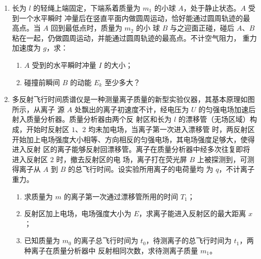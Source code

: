 \begin{enumerate}
\item
长为 $ l $ 的轻绳上端固定，下端系着质量为 $ m_{1} $ 的小球 $ A $，处于静止状态。$ A $ 受到一个水平瞬时
冲量后在竖直平面内做圆周运动，恰好能通过圆周轨迹的最高点。当 $ A $ 回到最低点时，质量为 $ m_{2} $ 的小
球 $ B $ 与之迎面正碰，碰后 $ A $、$ B $ 粘在一起，仍做圆周运动，并能通过圆周轨迹的最高点。不计空气阻力，重力加速度为 $ g $，求：
\begin{enumerate}
\item
$ A $ 受到的水平瞬时冲量 $ I $ 的大小；
\item 
碰撞前瞬间 $ B $ 的动能 $ E_{k} $ 至少多大？
\end{enumerate}







\newpage
\item
多反射飞行时间质谱仪是一种测量离子质量的新型实验仪器，其基本原理如图所示，从离子
源 $ A $ 处飘出的离子初速度不计，经电压为 $ U $ 的匀强电场加速后射入质量分析器。质量分析器由两个反
射区和长为 $ l $ 的漂移管（无场区域）构成，开始时反射区 $ 1 $、$ 2 $ 均未加电场，当离子第一次进入漂移管
时，两反射区开始加上电场强度大小相等、方向相反的匀强电场，其电场强度足够大，使得进入反射
区的离子能够反射回漂移管。离子在质量分析器中经多次往复即将进入反射区 $ 2 $ 时，撤去反射区的电
场，离子打在荧光屏 $ B $ 上被探测到，可测得离子从 $ A $ 到 $ B $ 的总飞行时间。设实验所用离子的电荷量均
为 $ q $，不计离子重力。
\begin{enumerate}
\item
求质量为 $ m $ 的离子第一次通过漂移管所用的时间 $ T_{1} $；
\item 
反射区加上电场，电场强度大小为 $ E $，求离子能进入反射区的最大距离 $ x $；
\item 
已知质量为 $ m_{0} $ 的离子总飞行时间为 $ t_{0} $，待测离子的总飞行时间为 $ t_{1} $，两种离子在质量分析器中
反射相同次数，求待测离子质量 $ m_{1} $。




\end{enumerate}
\end{enumerate}
